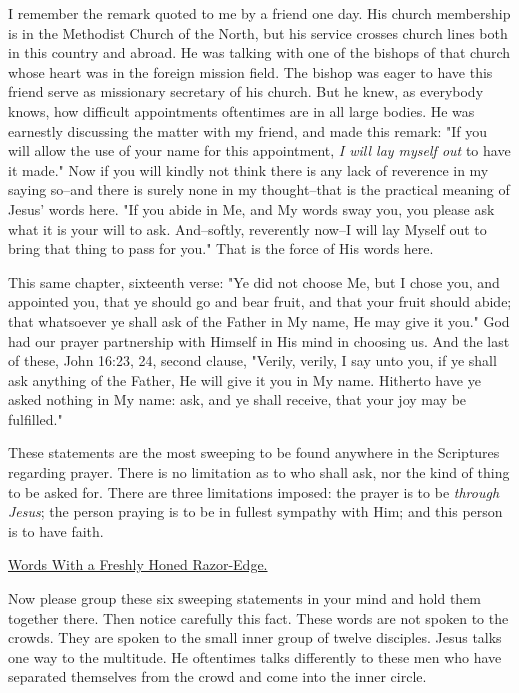 I remember the remark quoted to me by a friend one day. His church
membership is in the Methodist Church of the North, but his service
crosses church lines both in this country and abroad. He was talking with
one of the bishops of that church whose heart was in the foreign mission
field. The bishop was eager to have this friend serve as missionary
secretary of his church. But he knew, as everybody knows, how difficult
appointments oftentimes are in all large bodies. He was earnestly
discussing the matter with my friend, and made this remark: "If you will
allow the use of your name for this appointment, \textit{I will lay myself out}
to have it made." Now if you will kindly not think there is any lack of
reverence in my saying so--and there is surely none in my thought--that is
the practical meaning of Jesus' words here. "If you abide in Me, and My
words sway you, you please ask what it is your will to ask. And--softly,
reverently now--I will lay Myself out to bring that thing to pass for
you." That is the force of His words here.

This same chapter, sixteenth verse: "Ye did not choose Me, but I chose
you, and appointed you, that ye should go and bear fruit, and that your
fruit should abide; that whatsoever ye shall ask of the Father in My name,
He may give it you." God had our prayer partnership with Himself in His
mind in choosing us. And the last of these, John 16:23, 24, second clause,
"Verily, verily, I say unto you, if ye shall ask anything of the Father,
He will give it you in My name. Hitherto have ye asked nothing in My name:
ask, and ye shall receive, that your joy may be fulfilled."

These statements are the most sweeping to be found anywhere in the
Scriptures regarding prayer. There is no limitation as to who shall ask,
nor the kind of thing to be asked for. There are three limitations
imposed: the prayer is to be \textit{through Jesus}; the person praying is to be
in fullest sympathy with Him; and this person is to have faith.



\underline{Words With a Freshly Honed Razor-Edge.}


Now please group these six sweeping statements in your mind and hold them
together there. Then notice carefully this fact. These words are not
spoken to the crowds. They are spoken to the small inner group of twelve
disciples. Jesus talks one way to the multitude. He oftentimes talks
differently to these men who have separated themselves from the crowd and
come into the inner circle.

